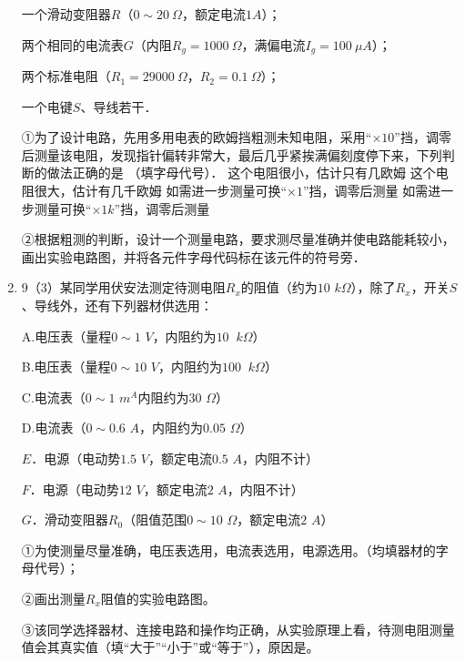 \begin{enumerate}[leftmargin=0em]
一个滑动变阻器$ R $（$ 0 \sim 20 \ \Omega $，额定电流$ 1A $）；

两个相同的电流表$ G $（内阻$ R_g=1000 \ \Omega $，满偏电流$ I_g=100\ \mu A $）；

两个标准电阻（$ R_1=29000 \ \Omega $，$ R_2=0.1 \ \Omega $）；

一个电键$ S $、导线若干．

①为了设计电路，先用多用电表的欧姆挡粗测未知电阻，采用“$ \times 10 $”挡，调零后测量该电阻，发现指针偏转非常大，最后几乎紧挨满偏刻度停下来，下列判断的做法正确的是 （填字母代号）．
\fourchoices
{这个电阻很小，估计只有几欧姆}
{这个电阻很大，估计有几千欧姆}
{如需进一步测量可换“$ \times 1 $”挡，调零后测量}
{如需进一步测量可换“$ \times 1k $”挡，调零后测量}

②根据粗测的判断，设计一个测量电路，要求测尽量准确并使电路能耗较小，画出实验电路图，并将各元件字母代码标在该元件的符号旁．



\item 
{}
$ 9 $（$ 3 $）某同学用伏安法测定待测电阻$ R_x $的阻值（约为$ 10 $ $ k\Omega $），除了$ R_x $，开关$ S $、导线外，还有下列器材供选用：

A.电压表（量程$ 0 \sim 1 $ $ V $，内阻约为$ 10 $ $ \ k\Omega $）

B.电压表（量程$ 0 \sim 10 $ $ V $，内阻约为$ 100 $ $ \ k\Omega $）

C.电流表（$ 0 \sim 1 $ $ m^{A} $内阻约为$ 30 $ $ \Omega $）

D.电流表（$ 0 \sim 0.6 $ $ A $，内阻约为$ 0.05 $ $ \Omega $）

$ E $．电源（电动势$ 1.5 $ $ V $，额定电流$ 0.5 $ $ A $，内阻不计）

$ F $．电源（电动势$ 12 $ $ V $，额定电流$ 2 $ $ A $，内阻不计）

$ G $．滑动变阻器$ R_{0} $（阻值范围$ 0 \sim 10 $ $ \Omega $，额定电流$ 2 $ $ A $）

①为使测量尽量准确，电压表选用，电流表选用，电源选用。（均填器材的字母代号）；

②画出测量$ R_x $阻值的实验电路图。

③该同学选择器材、连接电路和操作均正确，从实验原理上看，待测电阻测量值会其真实值（填“大于”“小于”或“等于”），原因是。

\end{enumerate}

